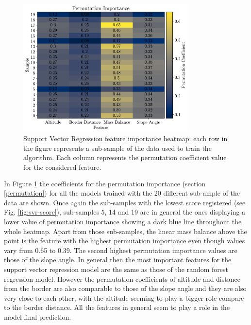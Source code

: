 \begin{figure}[!tp]
	\centering		  
	\includegraphics[width=0.8\textwidth]{figures/SVR_heatmap.pdf}
	\caption{Support Vector Regression feature importance heatmap: each row in the figure represents a sub-sample of the data used to train the algorithm. Each column represents the permutation coefficient value for the considered feature.}
	\label{fig:svr-heatmap}
\end{figure}

In Figure \ref{fig:svr-heatmap} the coefficients for the permutation importance (section \ref{permutation}) for all the models trained with the 20 different sub-ample of the data are shown. Once again the sub-samples with the lowest score registered (see Fig. \ref{fig:svr-score}), sub-samples 5, 14 and 19 are in general the ones displaying a lower value of permutation importance showing a dark blue line throughout the whole heatmap. Apart from those sub-samples, the linear mass balance above the point is the feature with the highest permutation importance even though values vary from 0.65 to 0.39. The second highest permutation importance values are those of the slope angle. In general then the most important features for the support vector regression model are the same as those of the random forest regression model. However the permutation coefficients of altitude and distance from the border are also comparable to those of the slope angle and they are also very close to each other, with the altitude seeming to play a bigger role compare to the border distance. All the features in general seem to play a role in the model final prediction. 

